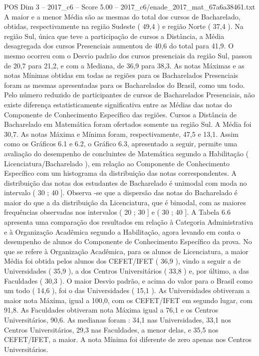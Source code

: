 \begin{textsample}{POS Dim 3 – 2017\_c6 – Score 5.00 – 2017\_c6/enade\_2017\_mat\_67a6a38461.txt}
A maior e a menor Média são as mesmas do total dos cursos de Bacharelado, obtidas, respectivamente na região Sudeste ( 49,4 ) e região Norte ( 37,4 ).
Na região Sul, única que teve a participação de cursos a Distância, a Média desagregada dos cursos Presenciais aumentou de 40,6 do total para 41,9.
O mesmo ocorreu com o Desvio padrão dos cursos presenciais da região Sul, passou de 20,7 para 21,2, e com a Mediana, de 36,9 para 38,3.
As notas Máximas e as notas Mínimas obtidas em todas as regiões para os Bacharelados Presenciais foram as mesmas apresentadas para os Bacharelados do Brasil, como um todo.
Pelo número reduzido de participantes de cursos de Bacharelados Presenciais, não existe diferença estatisticamente significativa entre as Médias das notas do Componente de Conhecimento Específico das regiões.
Cursos a Distância de Bacharelado em Matemática foram ofertados somente na região Sul.
A Média foi 30,7.
As notas Máxima e Mínima foram, respectivamente, 47,5 e 13,1.
Assim como os Gráficos 6.1 e 6.2, o Gráfico 6.3, apresentado a seguir, permite uma avaliação do desempenho de concluintes de Matemática segundo a Habilitação ( Licenciatura/Bacharelado ), em relação ao Componente de Conhecimento Específico com um histograma da distribuição das notas correspondentes.
A distribuição das notas dos estudantes de Bacharelado é unimodal com moda no intervalo ( 30 ; 40 ].
Observa -se que a dispersão das notas do Bacharelado é maior do que a da distribuição da Licenciatura, que é bimodal, com as maiores frequências observadas nos intervalos ( 20 ; 30 ] e ( 30 ; 40 ].
A Tabela 6.6 apresenta uma comparação dos resultados em relação à Categoria Administrativa e à Organização Acadêmica segundo a Habilitação, agora levando em conta o desempenho de alunos do Componente de Conhecimento Específico da prova.
No que se refere à Organização Acadêmica, para os alunos de Licenciatura, a maior Média foi obtida pelos alunos dos CEFET/IFET ( 36,9 ), vindo a seguir a de Universidades ( 35,9 ), a dos Centros Universitários ( 33,8 ) e, por último, a das Faculdades ( 30,3 ).
O maior Desvio padrão, e acima do valor para o Brasil como um todo ( 14,6 ), foi o das Universidades ( 15,1 ).
As Universidades obtiveram a maior nota Máxima, igual a 100,0, com os CEFET/IFET em segundo lugar, com 91,8.
As Faculdades obtiveram nota Máxima igual a 76,1 e os Centros Universitários, 90,6.
As medianas foram : 34,1 nas Universidades, 33,1 nos Centros Universitários, 29,3 nas Faculdades, a menor delas, e 35,5 nos CEFET/IFET, a maior.
A nota Mínima foi diferente de zero apenas nos Centros Universitários.

\end{textsample}
